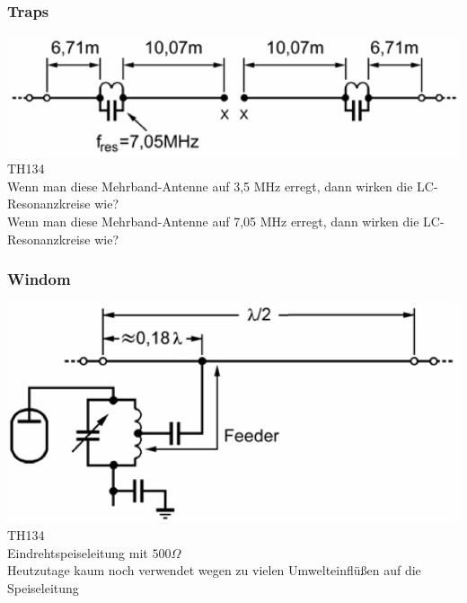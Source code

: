 \begin{frame}
  \frametitle{Traps}
  \begin{center}
    \includegraphics[width=1\textwidth]{a09/W3DZZ.png}
    \tiny \hyperlink{refs}{\cite{bna}} TH134 \\[1em] \large Wenn man diese Mehrband-Antenne auf 3,5 MHz erregt, dann wirken die LC-Resonanzkreise wie? \\[2em]
    Wenn man diese Mehrband-Antenne auf 7,05 MHz erregt, dann wirken die LC-Resonanzkreise wie?
  \end{center}
\end{frame}

\begin{frame}
  \frametitle{Windom}
  \begin{center}
    \includegraphics[width=1\textwidth]{a09/WINDOM_TH130.png}
    \tiny \hyperlink{refs}{\cite{bna}} TH134 \\[1em] \large Eindrehtspeiseleitung mit $500 \Omega$ \\[2em] Heutzutage kaum noch verwendet wegen zu vielen Umwelteinflüßen auf die Speiseleitung
  \end{center}
\end{frame}

